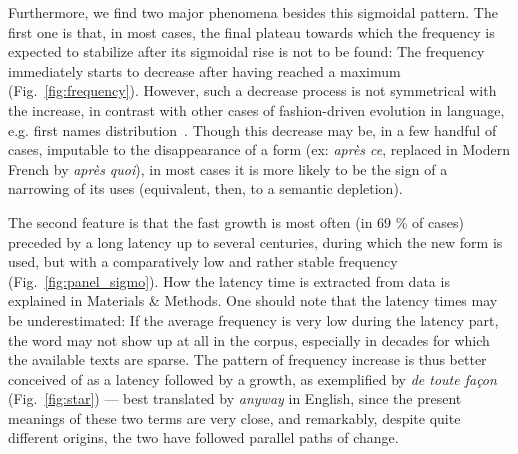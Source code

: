 \documentclass[12pt,twocolumn,amsmath,amssymb,aps,longbibliography]{revtex4-1}  %
\newcommand{\tit}{\textit}
\begin{document}
\begin{figure*}[!tbp]
\caption{\small Extracted pattern of frequency rise for nine selected forms. The latency period and the S-growth are separated by a red vertical line.}
\label{fig:panel_sigmo}
\end{figure*}

\begin{figure*}[!tbp]
\caption{\small Logit transforms of the S-growth part of the preceding curves. Red dots correspond to data points and the green line to the linear fit of this set of points. The $r^2$ coefficient of the linear fit is displayed as well.}
\label{fig:panel_logit}
\end{figure*}

Furthermore, we find two major phenomena besides this sigmoidal pattern. The first one is that, in most cases, the final plateau towards which the frequency is expected to stabilize after its sigmoidal rise is not to be found: The frequency immediately starts to decrease after having reached a maximum (Fig.~\ref{fig:frequency}). However, such a decrease process is not symmetrical with the increase, in contrast with other cases of fashion-driven evolution in language, e.g. first names distribution~\cite{coulmont2016diffusion}. Though this decrease may be, in a few handful of cases, imputable to the disappearance of a form (ex: \tit{apr\`es ce}, replaced in Modern French by \tit{apr\`es quoi}), in most cases it is more likely to be the sign of a narrowing of its uses (equivalent, then, to a semantic depletion). 

The second feature is that the fast growth is most often (in 69 \% of cases) preceded by a long latency up to several centuries, during which the new form is used, but with a comparatively low and rather stable frequency (Fig.~\ref{fig:panel_sigmo}). How the latency time is extracted from data is explained in Materials \& Methods. One should note that the latency times may be underestimated: If the average frequency is very low during the latency part, the word may not show up at all in the corpus, especially in decades for which the available texts are sparse. The pattern of frequency increase is thus better conceived of as a latency followed by a growth, as exemplified by \tit{de toute fa\c{c}on} (Fig.~\ref{fig:star}) --- best translated by \tit{anyway} in English, since the present meanings of these two terms are very close, and remarkably, despite quite different origins, the two have followed parallel paths of change.
\end{document}
